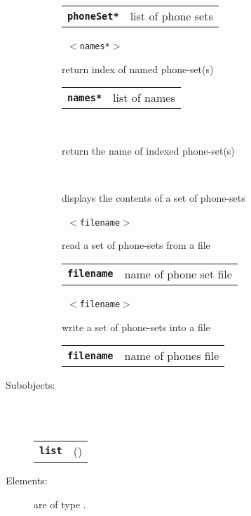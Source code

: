 \begin{description}
\begin{description}
      \begin{tabular}{ll}
 \texttt{\textbf{phoneSet*}} & list of phone sets \\
      \end{tabular}
       \texttt{ $<$names*$>$} \

        return index of named phone-set(s)

      \begin{tabular}{ll}
 \texttt{\textbf{names*}} & list of names \\
      \end{tabular}
       \texttt{} \

        return the name of indexed phone-set(s)

       \texttt{} \

        displays the contents of a set of phone-sets

       \texttt{ $<$filename$>$} \

        read a set of phone-sets from a file

      \begin{tabular}{ll}
 \texttt{\textbf{filename}} &  name of phone set file  \\
      \end{tabular}
       \texttt{ $<$filename$>$} \

        write a set of phone-sets into a file

      \begin{tabular}{ll}
 \texttt{\textbf{filename}} &  name of phones file  \\
      \end{tabular}
    \end{description}

  \item[Subobjects:] \hfill \\
\ 
    \begin{tabular}{ll}
      \texttt{\textbf{list}} & (\Jref{module}{List}) \\
    \end{tabular}
\vspace{3mm}

  \item[Elements:] are of type .


\end{description}

